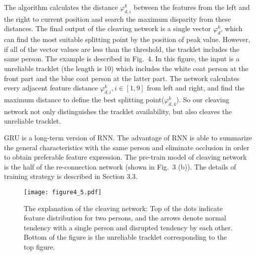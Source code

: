 \documentclass[5pt]{article}
\begin{document}
The algorithm calculates the distance $\varphi_{d,i}^k$ between the features from the left and the right to current position and search the maximum disparity from these distances. The final output of the cleaving network is a single vector $\varphi_d^k$, which can find the most suitable splitting point by the position of peak value. However, if all of the vector values are less than the threshold, the tracklet includes the same person. The example is described in Fig.\ 4. In this figure, the input is a unreliable tracklet (the length is 10) which includes the white coat person at the front part and the blue coat person at the latter part. The network calculates every adjacent feature distance $\varphi_{d,i}^k, i\in[1,9]$ from left and right, and find the maximum distance to define the best splitting point($\varphi_{d,4}^k$). So our cleaving network not only distinguishes the tracklet availability, but also cleaves the unreliable tracklet.


GRU is a long-term version of RNN. The advantage of RNN is able to summarize the general characteristics with the same person and eliminate occlusion in order to obtain preferable feature expression. The pre-train model of cleaving network is the half of the re-connection network (shown in Fig.\ 3 (b)). The details of training strategy is described in Section 3.3.
\begin{figure}
    \centering
    \texttt{[image: figure4\_5.pdf]}
    \vspace{-0.3cm}
    \caption{The explanation of the cleaving network: Top of the dots indicate feature distribution for two persons, and the arrows denote normal tendency with a single person and disrupted tendency by each other. Bottom of the figure is the unreliable tracklet corresponding to the top figure.}
\vspace{-0.6cm}
\end{figure}
\vspace{-0.4cm}
\end{document}
